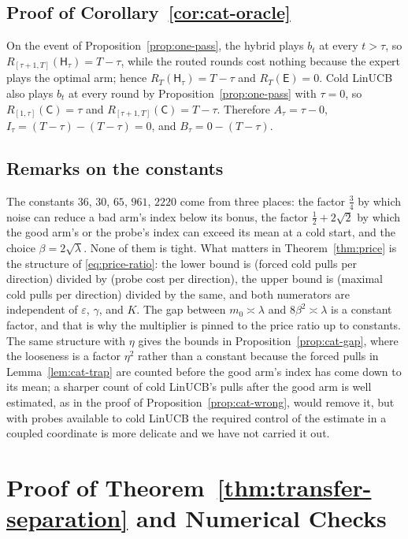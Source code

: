 \documentclass[anon]{alt2027} %
\providecommand{\qed}{\hfill\jmlrBlackBox}
\newcommand{\eps}{\varepsilon}
\newcommand{\Cold}{\mathsf{C}}
\newcommand{\Exp}{\mathsf{E}}
\newcommand{\Hyb}{\mathsf{H}}
\begin{document}
\subsection{Proof of Corollary~\ref{cor:cat-oracle}}

On the event of Proposition~\ref{prop:one-pass}, the hybrid plays $b_t$ at
every $t>\tau$, so $R_{[\tau+1,T]}(\Hyb_\tau)=T-\tau$, while the routed rounds
cost nothing because the expert plays the optimal arm; hence
$R_T(\Hyb_\tau)=T-\tau$ and $R_T(\Exp)=0$. Cold LinUCB also plays $b_t$ at
every round by Proposition~\ref{prop:one-pass} with $\tau=0$, so
$R_{[1,\tau]}(\Cold)=\tau$ and $R_{[\tau+1,T]}(\Cold)=T-\tau$. Therefore
$A_\tau=\tau-0$, $I_\tau=(T-\tau)-(T-\tau)=0$, and $B_\tau=0-(T-\tau)$. \qed

\subsection{Remarks on the constants}

The constants $36$, $30$, $65$, $961$, $2220$ come from three places: the
factor $\tfrac34$ by which noise can reduce a bad arm's index below its bonus,
the factor $\tfrac12+2\sqrt2$ by which the good arm's or the probe's index can
exceed its mean at a cold start, and the choice $\beta=2\sqrt\lambda$. None of
them is tight. What matters in Theorem~\ref{thm:price} is the structure of
\eqref{eq:price-ratio}: the lower bound is (forced cold pulls per direction)
divided by (probe cost per direction), the upper bound is (maximal cold pulls
per direction) divided by the same, and both numerators are independent of
$\eps$, $\gamma$, and $K$. The gap between $m_0\asymp\lambda$ and $8\beta^2\asymp\lambda$
is a constant factor, and that is why the multiplier is pinned to the price
ratio up to constants. The same structure with $\eta$ gives the bounds in
Proposition~\ref{prop:cat-gap}, where the looseness is a factor $\eta^2$ rather
than a constant because the forced pulls in Lemma~\ref{lem:cat-trap} are
counted before the good arm's index has come down to its mean; a sharper
count of cold LinUCB's pulls after the good arm is well estimated, as in the
proof of Proposition~\ref{prop:cat-wrong}, would remove it, but with probes
available to cold LinUCB the required control of the estimate in a coupled
coordinate is more delicate and we have not carried it out.


\section{Proof of Theorem~\ref{thm:transfer-separation} and Numerical Checks}
\label{app:proof-transfer-sep}
\end{document}
